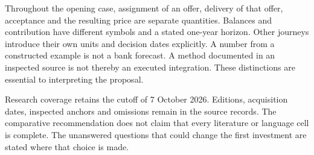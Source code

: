 Throughout the opening case, assignment of an offer, delivery of that offer,
acceptance and the resulting price are separate quantities. Balances and
contribution have different symbols and a stated one-year horizon. Other
journeys introduce their own units and decision dates explicitly. A number
from a constructed example is not a bank forecast. A method documented in an
inspected source is not thereby an executed integration. These distinctions
are essential to interpreting the proposal.

Research coverage retains the cutoff of 7 October 2026. Editions, acquisition
dates, inspected anchors and omissions remain in the source records. The
comparative recommendation does not claim that every literature or language
cell is complete. The unanswered questions that could change the first
investment are stated where that choice is made.
